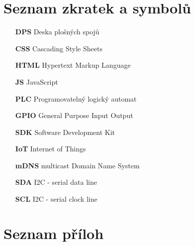 \chapter*{Seznam zkratek a symbolů}
\label{chap:loa}
\begin{itemize}
    \item[\textbf{DPS}] Deska plošných spojů

    \item[\textbf{CSS}] Cascading Style Sheets

    \item[\textbf{HTML}] Hypertext Markup Language

    \item[\textbf{JS}] JavaScript

    \item[\textbf{PLC}] Programovatelný logický automat

    \item[\textbf{GPIO}] General Purpose Input Output

    \item[\textbf{SDK}] Software Development Kit

    \item[\textbf{IoT}] Internet of Things

    \item[\textbf{mDNS}] multicast Domain Name System

    \item[\textbf{SDA}] I2C - serial data line

    \item[\textbf{SCL}] I2C - serial clock line
\end{itemize}

\printbibliography[heading=bibintoc,title={Seznam zdrojů}]

\listoffigures

\listoftables

\chapter*{Seznam příloh}
